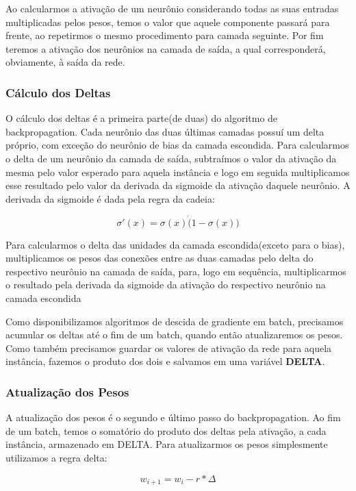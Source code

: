 \documentclass[a4paper, 11pt]{article}
\begin{document}
Ao calcularmos a ativação de um neurônio considerando todas as suas entradas multiplicadas pelos pesos, temos o valor que aquele componente passará para frente, ao repetirmos o mesmo procedimento para camada seguinte. Por fim teremos a ativação dos neurônios na camada de saída, a qual corresponderá, obviamente, à saída da rede.

\subsubsection{Cálculo dos Deltas}
O cálculo dos deltas é a primeira parte(de duas) do algoritmo de backpropagation. Cada neurônio das duas últimas camadas possuí um delta próprio, com exceção do neurônio de bias da camada escondida. Para calcularmos o delta de um neurônio da camada de saída, subtraímos o valor da ativação da mesma pelo valor esperado para aquela instância e logo em seguida multiplicamos esse resultado pelo valor da derivada da sigmoide da ativação daquele neurônio. A derivada da sigmoide é dada pela regra da cadeia:

\begin{equation*}
\sigma'(x) = \sigma(x) \dot (1 - \sigma(x))
\end{equation*}

Para calcularmos o delta das unidades da camada escondida(exceto para o bias), multiplicamos os pesos das conexões entre as duas camadas pelo delta do respectivo neurônio na camada de saída, para, logo em sequência, multiplicarmos o resultado pela derivada da sigmoide da ativação do respectivo neurônio na camada escondida

Como disponibilizamos algoritmos de descida de gradiente em batch, precisamos acumular os deltas até o fim de um batch, quando então atualizaremos os pesos. Como também precisamos guardar os valores de ativação da rede para aquela instância, fazemos o produto dos dois e salvamos em uma variável \textbf{DELTA}.

\subsubsection{Atualização dos Pesos}
A atualização dos pesos é o segundo e último passo do backpropagation. Ao fim de um batch, temos o somatório do produto dos deltas pela ativação, a cada instância, armazenado em DELTA. Para atualizarmos os pesos simplesmente utilizamos a regra delta:

\begin{equation*}
w_{i+1} = w_{i} - r * \Delta
\end{equation*}
\end{document}
